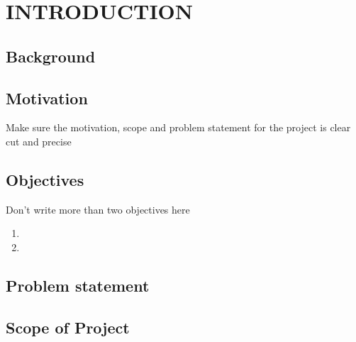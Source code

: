 \newpage
{}
\section{INTRODUCTION}



\subsection{Background}


\subsection{Motivation} 

Make sure the motivation, scope and problem statement for the project is clear cut and precise

\subsection{Objectives}

Don't write more than two objectives here 

\begin{enumerate}
	\item \par
	      
	\item \par
	      	
\end{enumerate}\par

\subsection{Problem statement}


\subsection{Scope of Project}

